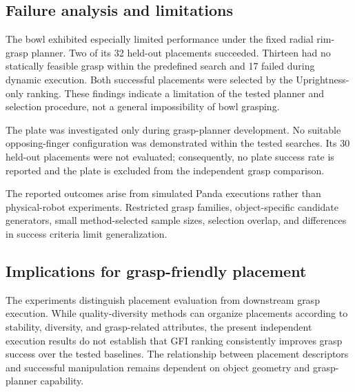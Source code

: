 \subsection{Failure analysis and limitations}
The bowl exhibited especially limited performance under the fixed radial rim-grasp planner. Two of its 32 held-out placements succeeded. Thirteen had no statically feasible grasp within the predefined search and 17 failed during dynamic execution. Both successful placements were selected by the Uprightness-only ranking. These findings indicate a limitation of the tested planner and selection procedure, not a general impossibility of bowl grasping.

The plate was investigated only during grasp-planner development. No suitable opposing-finger configuration was demonstrated within the tested searches. Its 30 held-out placements were not evaluated; consequently, no plate success rate is reported and the plate is excluded from the independent grasp comparison.

The reported outcomes arise from simulated Panda executions rather than physical-robot experiments. Restricted grasp families, object-specific candidate generators, small method-selected sample sizes, selection overlap, and differences in success criteria limit generalization.

\subsection{Implications for grasp-friendly placement}
The experiments distinguish placement evaluation from downstream grasp execution. While quality-diversity methods can organize placements according to stability, diversity, and grasp-related attributes, the present independent execution results do not establish that GFI ranking consistently improves grasp success over the tested baselines. The relationship between placement descriptors and successful manipulation remains dependent on object geometry and grasp-planner capability.
